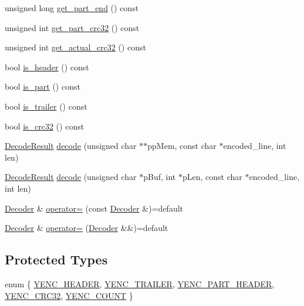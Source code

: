 \begin{DoxyCompactItemize}
\item 
unsigned long \hyperlink{classy_enc_1_1_decoder_a25b2f60414a2b3d4c3fff0c2e81a4987}{get\+\_\+part\+\_\+end} () const
\item 
unsigned int \hyperlink{classy_enc_1_1_decoder_abd4a081667ca8f1190bfcfc8e6d7639c}{get\+\_\+part\+\_\+crc32} () const
\item 
unsigned int \hyperlink{classy_enc_1_1_decoder_a4009ce9e9b4be8e2b18b44b2a329052e}{get\+\_\+actual\+\_\+crc32} () const
\item 
bool \hyperlink{classy_enc_1_1_decoder_a8dd093f0dbdaaaa216d8418ab35220e2}{is\+\_\+header} () const
\item 
bool \hyperlink{classy_enc_1_1_decoder_ab5c40f5cf7b55ac3ae4e0137b6aa8b7c}{is\+\_\+part} () const
\item 
bool \hyperlink{classy_enc_1_1_decoder_a555b5d3f2e3adcdb91d56bcec459871d}{is\+\_\+trailer} () const
\item 
bool \hyperlink{classy_enc_1_1_decoder_a0f44bd59e8e57492738ba81acc9af968}{is\+\_\+crc32} () const
\item 
\hyperlink{namespacey_enc_a6e002c8cbde1ad4f0f425b0b2b62c7ff}{Decode\+Result} \hyperlink{classy_enc_1_1_decoder_ab576e3517c991fba3030cfb4edf2b735}{decode} (unsigned char $\ast$$\ast$pp\+Mem, const char $\ast$encoded\+\_\+line, int len)
\item 
\hyperlink{namespacey_enc_a6e002c8cbde1ad4f0f425b0b2b62c7ff}{Decode\+Result} \hyperlink{classy_enc_1_1_decoder_a56e981189a5b72543cde1dca74bb459b}{decode} (unsigned char $\ast$p\+Buf, int $\ast$p\+Len, const char $\ast$encoded\+\_\+line, int len)
\item 
\hyperlink{classy_enc_1_1_decoder}{Decoder} \& \hyperlink{classy_enc_1_1_decoder_a7d1922d028848caa6ed0bb8f9c7662ab}{operator=} (const \hyperlink{classy_enc_1_1_decoder}{Decoder} \&)=default
\item 
\hyperlink{classy_enc_1_1_decoder}{Decoder} \& \hyperlink{classy_enc_1_1_decoder_aa279074f4cf635d9419c3f631c425341}{operator=} (\hyperlink{classy_enc_1_1_decoder}{Decoder} \&\&)=default
\end{DoxyCompactItemize}
\subsection*{Protected Types}
\begin{DoxyCompactItemize}
\item 
enum \{ \newline
\hyperlink{classy_enc_1_1_decoder_a15a9416c693c4a3333d0b2417decdffea309bf29906dc0c950eed8753d40c18af}{Y\+E\+N\+C\+\_\+\+H\+E\+A\+D\+ER}, 
\hyperlink{classy_enc_1_1_decoder_a15a9416c693c4a3333d0b2417decdffeafbc71ba43d628f3df8e85d07780c0dc4}{Y\+E\+N\+C\+\_\+\+T\+R\+A\+I\+L\+ER}, 
\hyperlink{classy_enc_1_1_decoder_a15a9416c693c4a3333d0b2417decdffea16ddaea0d6c5b97f3d87e351f596080a}{Y\+E\+N\+C\+\_\+\+P\+A\+R\+T\+\_\+\+H\+E\+A\+D\+ER}, 
\hyperlink{classy_enc_1_1_decoder_a15a9416c693c4a3333d0b2417decdffea6e93d0d81ac7ba42876216ff81afac0f}{Y\+E\+N\+C\+\_\+\+C\+R\+C32}, 
\newline
\hyperlink{classy_enc_1_1_decoder_a15a9416c693c4a3333d0b2417decdffeae4f10b60345053ec76d279f0b1a28dcf}{Y\+E\+N\+C\+\_\+\+C\+O\+U\+NT}
 \}
\end{DoxyCompactItemize}

